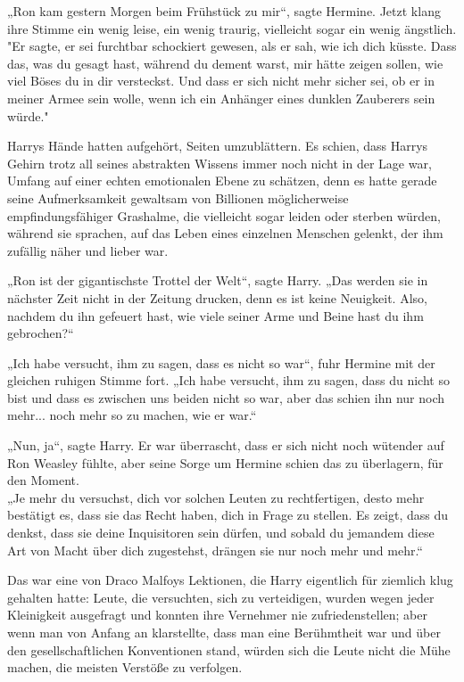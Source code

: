 {„Ron kam gestern Morgen beim Frühstück zu mir“, sagte Hermine. Jetzt klang ihre Stimme ein wenig leise, ein wenig traurig, vielleicht sogar ein wenig ängstlich.\\ "Er sagte, er sei furchtbar schockiert gewesen, als er sah, wie ich dich küsste. Dass das, was du gesagt hast, während du dement warst, mir hätte zeigen sollen, wie viel Böses du in dir versteckst. Und dass er sich nicht mehr sicher sei, ob er in meiner Armee sein wolle, wenn ich ein Anhänger eines dunklen Zauberers sein würde."

Harrys Hände hatten aufgehört, Seiten umzublättern. Es schien, dass Harrys Gehirn trotz all seines abstrakten Wissens immer noch nicht in der Lage war, Umfang auf einer echten emotionalen Ebene zu schätzen, denn es hatte gerade seine Aufmerksamkeit gewaltsam von Billionen möglicherweise empfindungsfähiger Grashalme, die vielleicht sogar leiden oder sterben würden, während sie sprachen, auf das Leben eines einzelnen Menschen gelenkt, der ihm zufällig näher und lieber war.

„Ron ist der gigantischste Trottel der Welt“, sagte Harry. „Das werden sie in nächster Zeit nicht in der Zeitung drucken, denn es ist keine Neuigkeit. Also, nachdem du ihn gefeuert hast, wie viele seiner Arme und Beine hast du ihm gebrochen?“

„Ich habe versucht, ihm zu sagen, dass es nicht so war“, fuhr Hermine mit der gleichen ruhigen Stimme fort. „Ich habe versucht, ihm zu sagen, dass du nicht so bist und dass es zwischen uns beiden nicht so war, aber das schien ihn nur noch mehr... noch mehr so zu machen, wie er war.“

„Nun, ja“, sagte Harry. Er war überrascht, dass er sich nicht noch wütender auf Ron Weasley fühlte, aber seine Sorge um Hermine schien das zu überlagern, für den Moment.\\ „Je mehr du versuchst, dich vor solchen Leuten zu rechtfertigen, desto mehr bestätigt es, dass sie das Recht haben, dich in Frage zu stellen. Es zeigt, dass du denkst, dass sie deine Inquisitoren sein dürfen, und sobald du jemandem diese Art von Macht über dich zugestehst, drängen sie nur noch mehr und mehr.“

Das war eine von Draco Malfoys Lektionen, die Harry eigentlich für ziemlich klug gehalten hatte: Leute, die versuchten, sich zu verteidigen, wurden wegen jeder Kleinigkeit ausgefragt und konnten ihre Vernehmer nie zufriedenstellen; aber wenn man von Anfang an klarstellte, dass man eine Berühmtheit war und über den gesellschaftlichen Konventionen stand, würden sich die Leute nicht die Mühe machen, die meisten Verstöße zu verfolgen.

}
